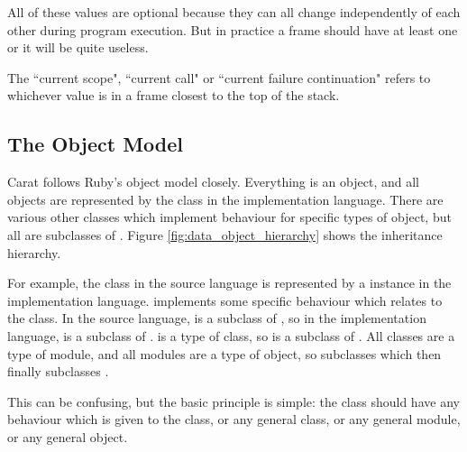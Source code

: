 All of these values are optional because they can all change independently of each other during program execution. But in practice a frame should have at least one or it will be quite useless.

The ``current scope", ``current call" or ``current failure continuation" refers to whichever value is in a frame closest to the top of the stack.

\subsection{The Object Model}
\label{sec:object_model}

Carat follows Ruby's object model closely. Everything is an object, and all objects are represented by the class  in the implementation language. There are various other classes which implement behaviour for specific types of object, but all are subclasses of . Figure \ref{fig:data_object_hierarchy} shows the inheritance hierarchy.

For example, the class  in the source language is represented by a  instance in the implementation language.  implements some specific behaviour which relates to the  class. In the source language,  is a subclass of , so in the implementation language,  is a subclass of .  is a type of class, so  is a subclass of . All classes are a type of module, and all modules are a type of object, so  subclasses  which then finally subclasses .

This can be confusing, but the basic principle is simple: the  class should have any behaviour which is given to the  class, or any general class, or any general module, or any general object.

